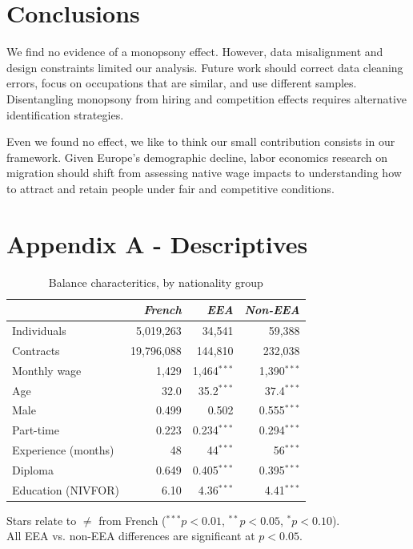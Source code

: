 \documentclass[10pt, a4paper]{article}
\begin{document}
\medskip

\section{Conclusions}
\smallskip
\noindent We find no evidence of a monopsony effect. However, data misalignment and design constraints limited our analysis. Future work should correct data cleaning errors, focus on occupations that are similar, and use different samples. Disentangling monopsony from hiring and competition effects requires alternative identification strategies.

\noindent Even we found no effect, we like to think our small contribution consists in our framework. Given Europe's demographic decline, labor economics research on migration should shift from assessing native wage impacts to understanding how to attract and retain people under fair and competitive conditions.
\clearpage



\appendix
\clearpage
\section*{Appendix A - Descriptives}

\begin{table}[h]
\caption{Balance characteritics, by nationality group}
\vspace{0.2cm}
\label{tab:balance_status}
\centering
\small
\begin{tabular}{lrrr}
 & \textit{French} & \textit{EEA} & \textit{Non-EEA} \\
\midrule
\midrule
Individuals & 5{,}019{,}263 & 34{,}541 & 59{,}388 \\
Contracts   & 19{,}796{,}088 & 144{,}810 & 232{,}038 \\
\midrule
Monthly wage & 1{,}429 & 1{,}464$^{***}$ & 1{,}390$^{***}$ \\
Age                 & 32.0 & 35.2$^{***}$ & 37.4$^{***}$ \\
Male                & 0.499 & 0.502        & 0.555$^{***}$ \\
Part-time           & 0.223 & 0.234$^{***}$ & 0.294$^{***}$ \\
Experience (months) & 48    & 44$^{***}$   & 56$^{***}$ \\
Diploma         & 0.649 & 0.405$^{***}$ & 0.395$^{***}$ \\
Education (NIVFOR)  & 6.10  & 4.36$^{***}$ & 4.41$^{***}$ \\
\bottomrule
\end{tabular}
\par\vspace{2pt}
{\footnotesize Stars relate to $\neq$ from French ($^{***}p<0.01$, $^{**}p<0.05$, $^{*}p<0.10$).\\All EEA vs. non-EEA differences are significant at $p<0.05$.}
\end{table}
\end{document}
